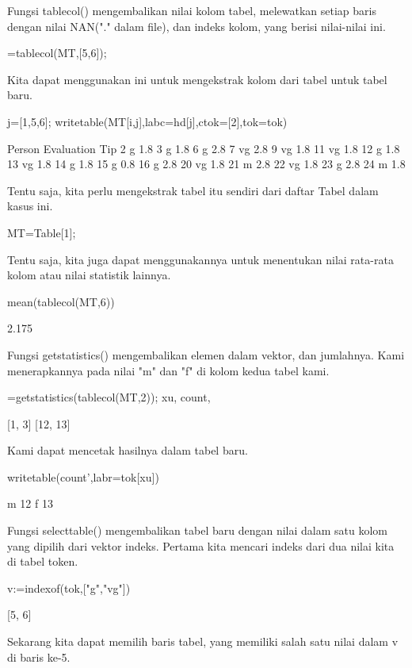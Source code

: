 \documentclass{article}
\begin{document}
Fungsi tablecol() mengembalikan nilai kolom tabel, melewatkan setiap
baris dengan nilai NAN("." dalam file), dan indeks kolom, yang berisi
nilai-nilai ini.


=tablecol(MT,[5,6]);


Kita dapat menggunakan ini untuk mengekstrak kolom dari tabel untuk
tabel baru.


\>j=[1,5,6]; writetable(MT[i,j],labc=hd[j],ctok=[2],tok=tok)


        Person Evaluation       Tip
             2          g       1.8
             3          g       1.8
             6          g       2.8
             7         vg       2.8
             9         vg       1.8
            11         vg       1.8
            12          g       1.8
            13         vg       1.8
            14          g       1.8
            15          g       0.8
            16          g       2.8
            20         vg       1.8
            21          m       2.8
            22         vg       1.8
            23          g       2.8
            24          m       1.8

Tentu saja, kita perlu mengekstrak tabel itu sendiri dari daftar Tabel
dalam kasus ini.


\>MT=Table[1];


Tentu saja, kita juga dapat menggunakannya untuk menentukan nilai
rata-rata kolom atau nilai statistik lainnya.


\>mean(tablecol(MT,6))


    2.175

Fungsi getstatistics() mengembalikan elemen dalam vektor, dan
jumlahnya. Kami menerapkannya pada nilai "m" dan "f" di kolom kedua
tabel kami.


=getstatistics(tablecol(MT,2)); xu, count,


    [1,  3]
    [12,  13]

Kami dapat mencetak hasilnya dalam tabel baru.


\>writetable(count',labr=tok[xu])


             m        12
             f        13

Fungsi selecttable() mengembalikan tabel baru dengan nilai dalam satu
kolom yang dipilih dari vektor indeks. Pertama kita mencari indeks
dari dua nilai kita di tabel token.


\>v:=indexof(tok,["g","vg"])


    [5,  6]

Sekarang kita dapat memilih baris tabel, yang memiliki salah satu
nilai dalam v di baris ke-5.
\end{document}
